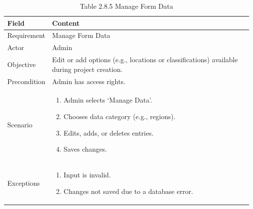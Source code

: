 \documentclass[12pt,oneside]{report}
\begin{document}
\begin{table}[H]
\centering
\caption{Table 2.8.5 Manage Form Data}
\label{tab:admin-manage-form-data}
\begin{tabularx}{\textwidth}{|p{3cm}|X|}
\hline
\textbf{Field} & \textbf{Content} \\ \hline

Requirement & Manage Form Data \\ \hline

Actor & Admin \\ \hline

Objective & Edit or add options (e.g., locations or classifications) available during project creation. \\ \hline

Precondition & Admin has access rights. \\ \hline

Scenario & 
\begin{minipage}[t]{0.75\textwidth}
\begin{enumerate}[leftmargin=*,label=\arabic*.]
\item Admin selects ‘Manage Data’.
\item Chooses data category (e.g., regions).
\item Edits, adds, or deletes entries.
\item Saves changes.
\end{enumerate}
\end{minipage} \\ \hline

Exceptions &
\begin{minipage}[t]{0.75\textwidth}
\begin{enumerate}[leftmargin=*,label=\arabic*.]
\item Input is invalid.
\item Changes not saved due to a database error.
\end{enumerate}
\end{minipage} \\ \hline

\end{tabularx}
\end{table}
\end{document}
